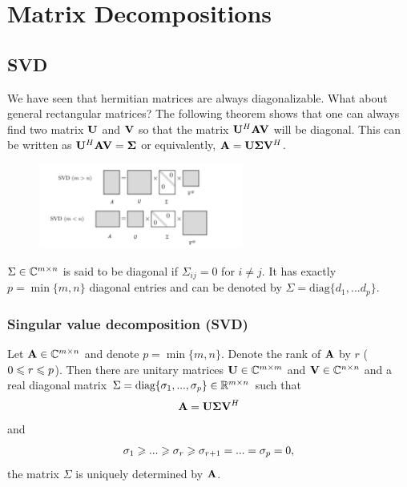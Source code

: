 \chapter{Matrix Decompositions}

\section{SVD}

We have seen that hermitian matrices are always diagonalizable. What about general rectangular matrices?
The following theorem shows that one can always find two matrix $\bold{U}$ and $\bold{V}$
so that the matrix $\bold{U}^H\bold{A}\bold{V}$ will be diagonal. This can be written as 
$\bold{U}^H\bold{A}\bold{V} = \bold{\Sigma }$ or equivalently, $\bold{A} = \bold{U}\bold{\Sigma }\bold{V}^H$.

\begin{figure}[htbp]
    \centering
    \includegraphics[width=0.6\textwidth]{figure/svd1.png}
    \caption{}
\end{figure}

\begin{remark}
    $\Sigma\in\mathbb{C}^{m\times n}$ is said to be diagonal if $\Sigma_{ij}=0$ for $i\neq j$.
    It has exactly $p=\min \{m,n\}$ diagonal entries and can be denoted by $\Sigma=\text{diag}\{d_1,...d_p\}$.
\end{remark}


\subsection{Singular value decomposition (SVD)}

\begin{theorem}{}{}
    Let $\bold{A}\in \mathbb{C}^{m\times n}$ and denote $p=\min\{m,n\}$.
    Denote the rank of $\bold{A}$ by $r$ ($0\leqslant r\leqslant p$).
    Then there are unitary matrices $\bold{U}\in \mathbb{C}^{m\times m}$ and $\bold{V}\in \mathbb{C}^{n\times n}$
    and a real diagonal matrix $\Sigma =\text{diag} \{\sigma_1,...,\sigma_p\}\in \mathbb{R}^{m\times n}$ such that 
    \begin{align*}
        \bold{A}=\bold{U}\bold{\Sigma}\bold{V}^H
    \end{align*}
    and 
    \begin{align*}
        \sigma_1\geqslant ...\geqslant \sigma_r\geqslant \sigma_{r+1}=...=\sigma_p=0,
    \end{align*}
    the matrix $\Sigma$ is uniquely determined by $\bold{A}$.
\end{theorem}

